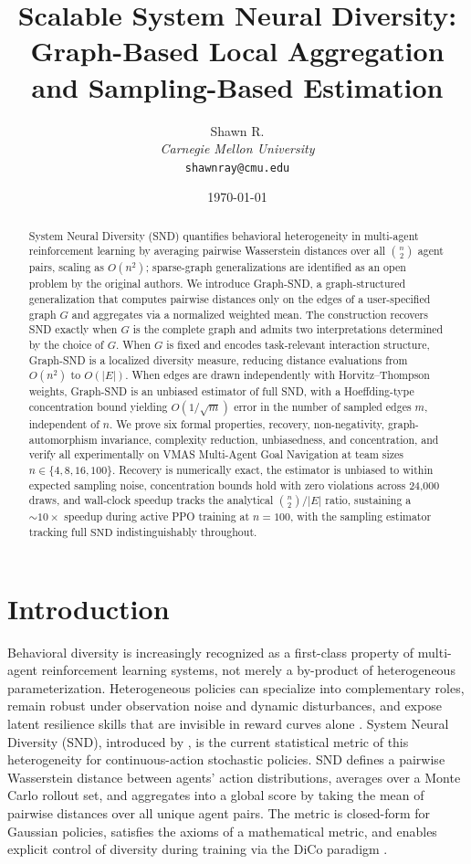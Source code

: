 \documentclass[11pt]{article}
\title{Scalable System Neural Diversity:\\
Graph-Based Local Aggregation and Sampling-Based Estimation}
\author{Shawn R.\\
\textit{Carnegie Mellon University}\\
\texttt{shawnray@cmu.edu}}
\date{\today}
\theoremstyle{plain}
\theoremstyle{definition}
\theoremstyle{remark}
\newcommand{\SND}{\ensuremath{\mathrm{SND}}}
\begin{document}
\maketitle

\begin{abstract}
System Neural Diversity (SND) quantifies behavioral heterogeneity in
multi-agent reinforcement learning by averaging pairwise Wasserstein distances
over all $\binom{n}{2}$ agent pairs, scaling as $O(n^2)$; sparse-graph
generalizations are identified as an open problem by the original authors.
We introduce Graph-SND, a graph-structured generalization that computes
pairwise distances only on the edges of a user-specified graph $G$ and
aggregates via a normalized weighted mean. The construction recovers SND
exactly when $G$ is the complete graph and admits two interpretations
determined by the choice of $G$. When $G$ is fixed and encodes task-relevant
interaction structure, Graph-SND is a localized diversity measure, reducing
distance evaluations from $O(n^2)$ to $O(|E|)$. When edges are drawn
independently with Horvitz--Thompson weights, Graph-SND is an unbiased
estimator of full SND, with a Hoeffding-type concentration bound yielding
$O(1/\sqrt{m})$ error in the number of sampled edges $m$, independent of $n$.
We prove six formal properties, recovery, non-negativity,
graph-automorphism invariance, complexity reduction, unbiasedness, and
concentration, and verify all experimentally on VMAS Multi-Agent Goal Navigation at team sizes $n \in \{4, 8, 16, 100\}$. Recovery is numerically exact, the estimator is unbiased to within expected sampling noise, concentration bounds hold with zero violations across 24{,}000 draws, and wall-clock speedup tracks the analytical $\binom{n}{2}/|E|$ ratio, sustaining a ${\sim}\!10\times$ speedup during active PPO training at $n=100$, with the sampling estimator tracking full $\SND$ indistinguishably throughout.
\end{abstract}
\section{Introduction}
\label{sec:intro}

Behavioral diversity is increasingly recognized as a first-class
property of multi-agent reinforcement learning systems, not merely a
by-product of heterogeneous parameterization. Heterogeneous policies
can specialize into complementary roles, remain robust under
observation noise and dynamic disturbances, and expose latent
resilience skills that are invisible in reward curves alone
\citep{bettini2023hetgppo, bettini2025snd}. System Neural Diversity
(SND), introduced by \citet{bettini2025snd}, is the current
statistical metric of this heterogeneity for continuous-action
stochastic policies. SND defines a pairwise Wasserstein distance
between agents' action distributions, averages over a Monte Carlo
rollout set, and aggregates into a global score by taking the mean of
pairwise distances over all unique agent pairs. The metric is
closed-form for Gaussian policies, satisfies the axioms of a
mathematical metric, and enables explicit control of diversity during
training via the DiCo paradigm \citep{bettini2024dico}.
\end{document}
